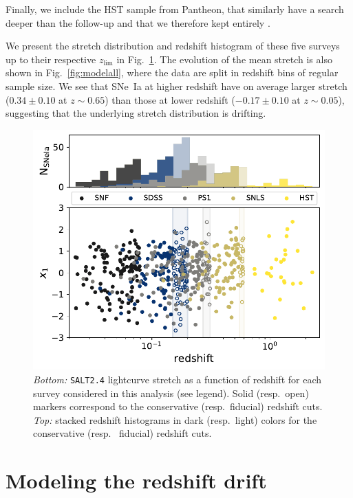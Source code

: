 \documentclass[]{aa}
\begin{document}
Finally, we include the HST sample from Pantheon, that similarly have a search
deeper than the follow-up and that we therefore kept entirely
\citep{strolger04}.

We present the stretch distribution and redshift histogram of these five surveys
up to their respective $z_{\lim}$ in Fig.~\ref{fig:sample}. The evolution of
the mean stretch is also shown in Fig.~\ref{fig:modelall}, where the data are
split in redshift bins of regular sample size. We see that SNe~Ia at higher
redshift have on average larger stretch ($0.34 \pm 0.10$ at $z\sim0.65$) than
those at lower redshift ($-0.17\pm 0.10$ at $z\sim0.05$), suggesting that the
underlying stretch distribution is drifting.

\begin{figure}
    \centering
    \includegraphics[width=0.95\linewidth]{Article_figures/stretchs-cut_btw_hist_stac_75-lb-cividis.pdf}
    \caption{\textit{Bottom:} \textsc{\texttt{SALT2.4}} lightcurve stretch as a
        function of redshift for each survey considered in this analysis (see
        legend). Solid (resp.\ open) markers correspond to the conservative
        (resp.\ fiducial) redshift cuts. \textit{Top:} stacked redshift
        histograms in dark (resp.\ light) colors for the conservative (resp.
        \ fiducial) redshift cuts.}
    \label{fig:sample}
\end{figure}

\section{Modeling the redshift drift}\label{sec:modeling}
\end{document}
